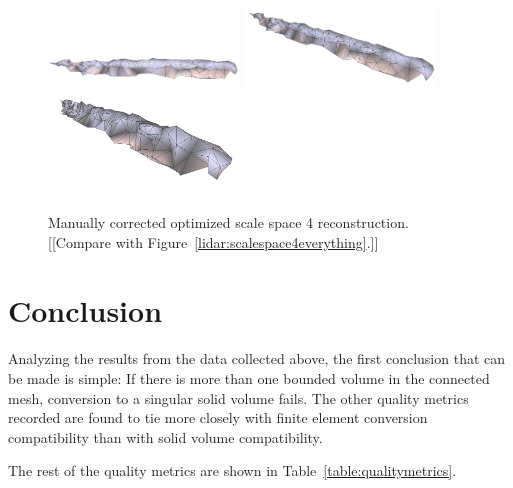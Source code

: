\documentclass[12pt]{drexelthesis}
\begin{document}
\begin{figure}[!ht]
	\centering
		\includegraphics[width=2in]{real-lab-scans/meshed/optimized/scaleSpace4Modified00.png}
		\includegraphics[width=2in]{real-lab-scans/meshed/optimized/scaleSpace4Modified01.png}
		\includegraphics[width=2in]{real-lab-scans/meshed/optimized/scaleSpace4Modified02.png}
	\caption[Modified optimized surface mesh at scale space 4.]{\centering Manually corrected optimized scale space 4 reconstruction. [[Compare with Figure~\ref{lidar:scalespace4everything}.]]}
	\label{real:modified4}
\end{figure}




















\chapter{Conclusion}
\label{chap:conclusion}

Analyzing the results from the data collected above, the first conclusion that can be made is simple: If there is more than one bounded volume in the connected mesh, conversion to a singular solid volume fails. The other quality metrics recorded are found to tie more closely with finite element conversion compatibility than with solid volume compatibility. 

The rest of the quality metrics are shown in Table~\ref{table:qualitymetrics}.
\end{document}
